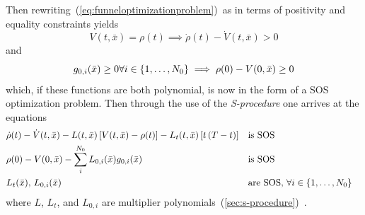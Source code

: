 Then rewriting~(\ref{eq:funneloptimizationproblem})~as in terms of positivity
and equality constraints yields
\begin{equation}
  V(t,\bar{x}) = \rho(t) \implies \dot{\rho}(t) - \dot{V}(t,\bar{x}) > 0
\end{equation}
and
\begin{equation}
  g_{0,i}(\bar{x}) \geq 0 \forall i \in \lbrace1,\ldots,N_0\rbrace \implies \rho(0) - V(0,\bar{x}) \geq 0
\end{equation}
which, if these functions are both polynomial, is now in the form of a \ac{SOS}
optimization problem. Then through the use of the \textit{S-procedure} one
arrives at the equations
\begin{align}
  &\dot{\rho}(t) - \dot{V}(t,\bar{x}) - L(t,\bar{x})\left[ V(t,\bar{x}) - \rho(t) \right] - L_{t}(t,\bar{x})\left[ t\left( T - t \right) \right]  && \text{is SOS}& \label{eq:sufficient-conditions}\\
  & \rho(0) - V(0,\bar{x}) - \sum_{i}^{N_{0}} L_{0,i}(\bar{x})g_{0,i}(\bar{x}) && \text{is SOS}& \\
  & L_{t}(\bar{x}), \, L_{0,i}(\bar{x}) \; &&\text{are SOS}, \, \forall i \in \lbrace1,\ldots,N_{0}\rbrace \label{eq:sufficient-conditions3} \\
\end{align} 
where \(L\), \(L_{t}\), and \(L_{0,i}\) are multiplier
polynomials~(\ref{sec:s-procedure})~.

